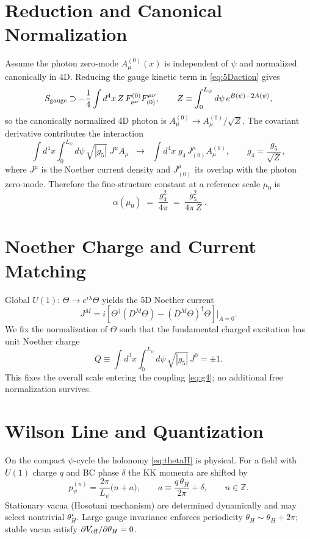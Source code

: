 \documentclass[12pt]{article}
\begin{document}
\section{Reduction and Canonical Normalization}
Assume the photon zero-mode $A_\mu^{(0)}(x)$ is independent of $\psi$ and normalized canonically in 4D.
Reducing the gauge kinetic term in \eqref{eq:5Daction} gives
\begin{equation}
S_{\rm gauge} \supset -\frac{1}{4}\int d^4x\, Z\, F_{\mu\nu}^{(0)}F^{\mu\nu}_{(0)},
\qquad
Z \equiv \int_0^{L_\psi} d\psi\, e^{B(\psi)-2A(\psi)},
\label{eq:Zfactor}
\end{equation}
so the canonically normalized 4D photon is $A_\mu^{(0)} \to A_\mu^{(0)}/\sqrt{Z}$.
The covariant derivative contributes the interaction
\begin{equation}
\int d^4x \int_0^{L_\psi}\! d\psi \,\sqrt{|g_5|}\; J^\mu A_\mu
\;\;\longrightarrow\;\;
\int d^4x \; g_4\, J^\mu_{(0)} A^{(0)}_\mu,
\qquad
g_4 = \frac{g_5}{\sqrt{Z}},
\label{eq:g4}
\end{equation}
where $J^\mu$ is the Noether current density and $J^\mu_{(0)}$ its overlap with the photon zero-mode.
Therefore the fine-structure constant at a reference scale $\mu_0$ is
\begin{equation}
\boxed{ \;\alpha(\mu_0) \;=\; \frac{g_4^2}{4\pi} \;=\; \frac{g_5^2}{4\pi\, Z}\; }.
\label{eq:alpha-master}
\end{equation}

\section{Noether Charge and Current Matching}
Global $U(1)$: $\Theta \to e^{i\lambda} \Theta$ yields the 5D Noether current
\begin{equation}
J^M = i \left[ \Theta^\dagger (D^M \Theta) - (D^M \Theta)^\dagger \Theta \right] \Big|_{A=0}.
\end{equation}
We fix the normalization of $\Theta$ such that the fundamental charged excitation has unit Noether charge
\begin{equation}
Q \equiv \int d^3x \int_0^{L_\psi} d\psi \, \sqrt{|g_5|}\, J^0 = \pm 1.
\label{eq:Q1}
\end{equation}
This fixes the overall scale entering the coupling \eqref{eq:g4}; no additional free normalization survives.

\section{Wilson Line and Quantization}
On the compact $\psi$-cycle the holonomy \eqref{eq:thetaH} is physical.
For a field with $U(1)$ charge $q$ and BC phase $\delta$ the KK momenta are shifted by
\begin{equation}
p_\psi^{(n)} = \frac{2\pi}{L_\psi}\Big(n + a\Big),\qquad a \equiv \frac{q\,\theta_H}{2\pi} + \delta,\qquad n\in\mathbb{Z}.
\label{eq:shift}
\end{equation}
Stationary vacua (Hosotani mechanism) are determined dynamically and may select nontrivial $\theta_H^\star$.
Large gauge invariance enforces periodicity $\theta_H \sim \theta_H + 2\pi$; stable vacua satisfy $\partial V_{\rm eff}/\partial \theta_H=0$.
\end{document}
